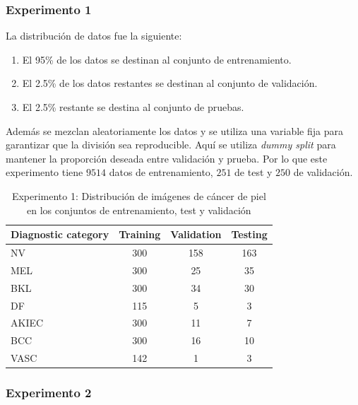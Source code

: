 \subsubsection{Experimento 1}

   La distribución de datos fue la siguiente:

   \begin{enumerate}
      \item El 95\% de los datos se destinan al conjunto de entrenamiento.
      \item El 2.5\% de los datos restantes se destinan al conjunto de validación.
      \item El 2.5\% restante se destina al conjunto de pruebas.
   \end{enumerate}
   
   Además se mezclan aleatoriamente los datos y se utiliza una variable fija para garantizar que la división sea reproducible. Aquí se utiliza \textit{dummy split} para mantener la proporción deseada entre validación y prueba. Por lo que este experimento tiene $9514$ datos de entrenamiento, $251$ de test y $250$ de validación.

   \begin{table}[ht]
      \centering
      \begin{tabular}{lccc}
      \hline
      \textbf{Diagnostic category} & \textbf{Training} & \textbf{Validation} & \textbf{Testing} \\
      \hline
      NV       & 300 & 158 & 163 \\
      MEL      & 300 & 25  & 35  \\
      BKL      & 300 & 34  & 30  \\
      DF       & 115 & 5   & 3   \\
      AKIEC    & 300 & 11  & 7   \\
      BCC      & 300 & 16  & 10  \\
      VASC     & 142 & 1   & 3   \\ \hline
      \end{tabular}
      \caption{Experimento 1: Distribución de imágenes de cáncer de piel en los conjuntos de entrenamiento, test y validación}
      \label{table:train_test_validate_e1}
      \end{table}
   



\subsubsection{Experimento 2}

